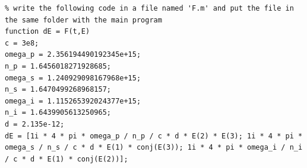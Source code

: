 \documentclass[UTF8,10pt,a4paper]{article}
\theoremstyle{Problem}
\theoremstyle{Solution}
\begin{document}
\begin{lstlisting}
% write the following code in a file named 'F.m' and put the file in the same folder with the main program
function dE = F(t,E)
c = 3e8;
omega_p = 2.356194490192345e+15;
n_p = 1.6456018271928685;
omega_s = 1.240929098167968e+15;
n_s = 1.6470499268968157;
omega_i = 1.115265392024377e+15;
n_i = 1.6439905613250965;
d = 2.135e-12;
dE = [1i * 4 * pi * omega_p / n_p / c * d * E(2) * E(3); 1i * 4 * pi * omega_s / n_s / c * d * E(1) * conj(E(3)); 1i * 4 * pi * omega_i / n_i / c * d * E(1) * conj(E(2))];
\end{lstlisting}
\end{document}
